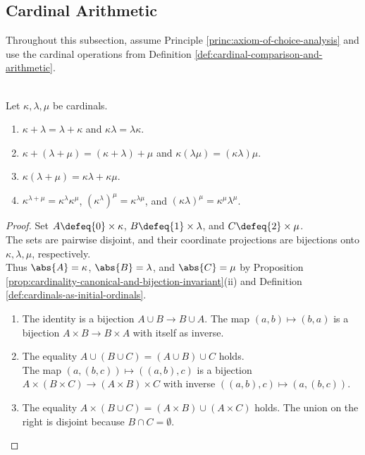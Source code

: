 \subsection{Cardinal Arithmetic}

Throughout this subsection, assume Principle \ref{princ:axiom-of-choice-analysis} and use the cardinal operations from Definition \ref{def:cardinal-comparison-and-arithmetic}.

\begin{proposition} \label{prop:cardinal-arithmetic-reference-laws} \\
Let $\kappa,\lambda,\mu$ be cardinals.
\begin{enumerate}[label=(\roman*)]
\setlength{\itemsep}{0pt}
\item $\kappa+\lambda=\lambda+\kappa$ and $\kappa\lambda=\lambda\kappa$.
\item $\kappa+(\lambda+\mu)=(\kappa+\lambda)+\mu$ and $\kappa(\lambda\mu)=(\kappa\lambda)\mu$.
\item $\kappa(\lambda+\mu)=\kappa\lambda+\kappa\mu$.
\item $\kappa^{\lambda+\mu}=\kappa^\lambda\kappa^\mu$, $(\kappa^\lambda)^\mu=\kappa^{\lambda\mu}$, and $(\kappa\lambda)^\mu=\kappa^\mu\lambda^\mu$.
\end{enumerate}
\begin{proof}
Set $A\defeq\{0\}\times\kappa$, $B\defeq\{1\}\times\lambda$, and $C\defeq\{2\}\times\mu$.\\
The sets are pairwise disjoint, and their coordinate projections are bijections onto $\kappa,\lambda,\mu$, respectively.\\
Thus $\abs{A}=\kappa$, $\abs{B}=\lambda$, and $\abs{C}=\mu$ by Proposition \ref{prop:cardinality-canonical-and-bijection-invariant}(ii) and Definition \ref{def:cardinals-as-initial-ordinals}.
\begin{enumerate}[label=(\roman*)]
\setlength{\itemsep}{0pt}
\item The identity is a bijection $A\cup B\to B\cup A$. The map $(a,b)\mapsto(b,a)$ is a bijection $A\times B\to B\times A$ with itself as inverse.
\item The equality $A\cup(B\cup C)=(A\cup B)\cup C$ holds.\\
The map $(a,(b,c))\mapsto((a,b),c)$ is a bijection $A\times(B\times C)\to(A\times B)\times C$ with inverse $((a,b),c)\mapsto(a,(b,c))$.
\item The equality $A\times(B\cup C)=(A\times B)\cup(A\times C)$ holds. The union on the right is disjoint because $B\cap C=\emptyset$.

\end{enumerate}
\end{proof}
\end{proposition}
